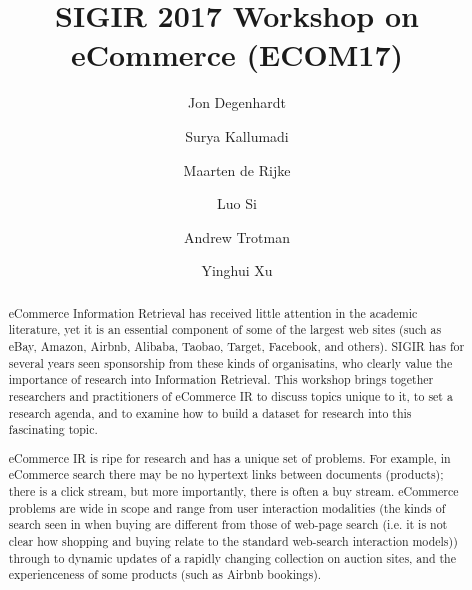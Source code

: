\documentclass[sigconf]{acmart}
\begin{document}
\title{SIGIR 2017 Workshop on eCommerce (ECOM17)}

\author{Jon Degenhardt}


\author{Surya Kallumadi}

\author{Maarten de Rijke}


\author{Luo Si}

\author{Andrew Trotman}

\author{Yinghui Xu}

\renewcommand{\shortauthors}{J. Degenhardt et al.}


\begin{abstract}
eCommerce Information Retrieval has received little attention in the
academic literature, yet it is an essential component of some of the
largest web sites (such as eBay, Amazon, Airbnb,  Alibaba, Taobao, Target, Facebook, and others).  SIGIR has for
several years seen sponsorship from these kinds of organisatins, who clearly value the
importance of research into Information Retrieval.  This
workshop  brings together researchers and practitioners of
eCommerce IR to discuss topics unique to it, to set a research agenda,
and to examine how to build a dataset for research into this fascinating topic.

eCommerce IR is ripe for research and has a unique
set of problems.  For example, in eCommerce search there may be no hypertext links
between documents (products); there is a click stream, but more importantly, there
is often a buy stream.  eCommerce problems are wide in scope and range from user interaction
modalities (the kinds of search seen in when buying are different from those
of web-page search (i.e. it is not clear how shopping and buying relate to the standard
web-search interaction models)) through to dynamic updates of a rapidly
changing collection on auction sites, and the experienceness of some products (such as Airbnb bookings).
\end{abstract}

%
%
\end{document}
